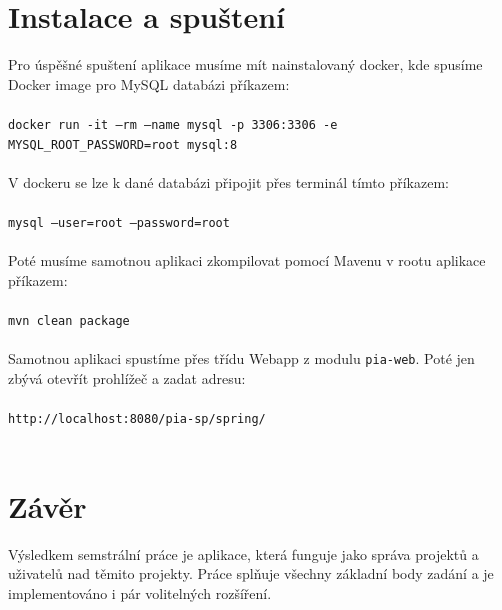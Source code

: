 \documentclass[czech,P5]{thesiskiv}
\begin{document}
\chapter{Instalace a spuštení}
Pro úspěšné spuštení aplikace musíme mít nainstalovaný docker, kde spusíme Docker image pro MySQL databázi příkazem:
\\\\
\texttt{docker run -it --rm --name mysql -p 3306:3306 -e MYSQL\_ROOT\_PASSWORD=root mysql:8}
\\\\
V dockeru se lze k dané databázi připojit přes terminál tímto příkazem:
\\\\
\texttt{mysql --user=root --password=root}
\\\\
Poté musíme samotnou aplikaci zkompilovat pomocí Mavenu v rootu aplikace příkazem:
\\\\
\texttt{mvn clean package}
\\\\
Samotnou aplikaci spustíme přes třídu Webapp z modulu \texttt{pia-web}. Poté jen zbývá otevřít prohlížeč a zadat adresu:
\\\\
\texttt{http://localhost:8080/pia-sp/spring/}
\\\\

\chapter{Závěr}
Výsledkem semstrální práce je aplikace, která funguje jako správa projektů a uživatelů nad těmito projekty. Práce splňuje všechny základní body zadání a je implementováno i pár volitelných rozšíření.
\end{document}
